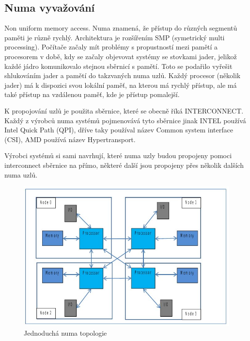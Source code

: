 \documentclass[a4paper,12pt]{article}
\begin{document}
\newpage
\subsection{Numa vyvažování}

Non uniform memory access. Numa znamená, že přístup do různých segmentů paměti je různě rychlý. Architektura je rozšířením SMP (symetrický multi processing). Počítače začaly mít problémy s propustností mezi pamětí a procesorem v době, kdy se začaly objevovat systémy se stovkami jader, jelikož každé jádro komunikovalo stejnou sběrnicí s pamětí. Toto se podařilo vyřešit shlukováním jader a pamětí do takzvaných numa uzlů. Každý procesor (několik jader) má k dispozici svou lokální paměť, na kterou má rychlý přístup, ale má také přístup na vzdálenou paměť, kde je přístup pomalejší.

K propojování uzlů je použita sběrnice, které se obecně říká INTERCONNECT. Každý z výrobců numa systémů pojmenovává tyto sběrnice jinak INTEL používá Intel Quick Path (QPI), dříve taky používal název Common system interface (CSI), AMD používá název Hypertransport.

Výrobci systémů si sami navrhují, které numa uzly budou propojeny pomoci interconnect sběrnice na přímo, některé další jsou propojeny přes několik dalších numa uzlů. 


\begin{figure}[ht]
\includegraphics[scale=0.78]{obrazky/numa-scheme.jpeg}
\caption{Jednoduchá numa topologie}
\label{numa scheme1}
\end{figure}
\end{document}

